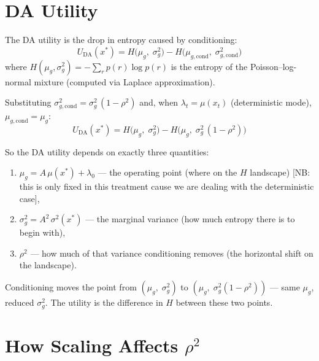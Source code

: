 \documentclass[11pt]{article}
\begin{document}
\section{DA Utility}

The DA utility is the drop in entropy caused by conditioning:
\begin{equation}\label{eq:uda}
    U_{\mathrm{DA}}(x^*)
    = H\!\bigl(\mu_g,\;\sigma^2_g\bigr)
    - H\!\bigl(\mu_{g,\mathrm{cond}},\;\sigma^2_{g,\mathrm{cond}}\bigr)
\end{equation}
where $H(\mu_g, \sigma^2_g) = -\sum_r p(r)\log p(r)$ is the entropy
of the Poisson--log-normal mixture (computed via Laplace approximation).

Substituting $\sigma^2_{g,\mathrm{cond}} = \sigma^2_g\,(1 - \rho^2)$
and, when $\lambda_t = \mu(x_t)$ (deterministic mode),
$\mu_{g,\mathrm{cond}} = \mu_g$:
\begin{equation}\label{eq:uda_rho}
    \boxed{\;
    U_{\mathrm{DA}}(x^*)
    = H\!\bigl(\mu_g,\;\sigma^2_g\bigr)
    - H\!\bigl(\mu_g,\;\sigma^2_g\,(1 - \rho^2)\bigr)
    \;}
\end{equation}

So the DA utility depends on exactly three quantities:
\begin{enumerate}
    \item $\mu_g = A\,\mu(x^*) + \lambda_0$ --- the operating point
        (where on the $H$ landscape) [NB: this is only fixed in this treatment cause we are dealing with the deterministic case],
    \item $\sigma^2_g = A^2\,\sigma^2(x^*)$ --- the marginal variance
        (how much entropy there is to begin with),
    \item $\rho^2$ --- how much of that variance conditioning removes
        (the horizontal shift on the landscape).
\end{enumerate}

Conditioning moves the point from $(\mu_g,\;\sigma^2_g)$ to
$(\mu_g,\;\sigma^2_g(1-\rho^2))$ --- same $\mu_g$, reduced $\sigma^2_g$.
The utility is the difference in $H$ between these two points.


\section{How Scaling Affects $\rho^2$}
\end{document}
